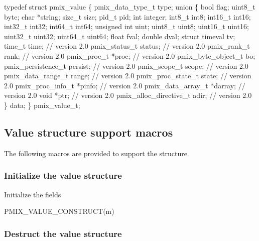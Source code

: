 \cspecificstart
\begin{codepar}
typedef struct pmix_value \{
    pmix_data_type_t type;
    union \{
        bool flag;
        uint8_t byte;
        char *string;
        size_t size;
        pid_t pid;
        int integer;
        int8_t int8;
        int16_t int16;
        int32_t int32;
        int64_t int64;
        unsigned int uint;
        uint8_t uint8;
        uint16_t uint16;
        uint32_t uint32;
        uint64_t uint64;
        float fval;
        double dval;
        struct timeval tv;
        time_t time;                    // version 2.0
        pmix_status_t status;           // version 2.0
        pmix_rank_t rank;               // version 2.0
        pmix_proc_t *proc;              // version 2.0
        pmix_byte_object_t bo;
        pmix_persistence_t persist;     // version 2.0
        pmix_scope_t scope;             // version 2.0
        pmix_data_range_t range;        // version 2.0
        pmix_proc_state_t state;        // version 2.0
        pmix_proc_info_t *pinfo;        // version 2.0
        pmix_data_array_t *darray;      // version 2.0
        void *ptr;                      // version 2.0
        pmix_alloc_directive_t adir;    // version 2.0
    \} data;
\} pmix_value_t;
\end{codepar}
\cspecificend

\subsection{Value structure support macros}
The following macros are provided to support the  structure.

\subsubsection{Initialize the value structure}

Initialize the  fields

\cspecificstart
\begin{codepar}
PMIX_VALUE_CONSTRUCT(m)
\end{codepar}
\cspecificend

\begin{arglist}
\end{arglist}

\subsubsection{Destruct the value structure}

